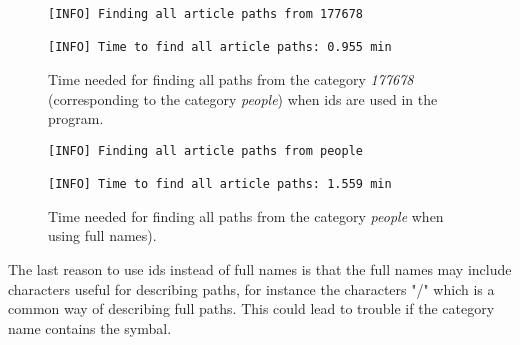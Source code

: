 \begin{figure}[h]
\centering
\begin{lstlisting}
[INFO] Finding all article paths from 177678

[INFO] Time to find all article paths: 0.955 min
\end{lstlisting}
\caption[Time for all paths for \emph{people} when using ids]{Time needed for finding all paths from the category \emph{177678} (corresponding to the category \emph{people}) when ids are used in the program.}
\label{fig:id_lookup}
\end{figure}


\begin{figure}[h]
\centering
\begin{lstlisting}
[INFO] Finding all article paths from people

[INFO] Time to find all article paths: 1.559 min
\end{lstlisting}
\caption[Time for all paths for \emph{people} when using full names]{Time needed for finding all paths from the category \emph{people} when using full names).}
\label{fig:fullname_lookup}
\end{figure}
 
The last reason to use ids instead of full names is that the full names may include characters useful for describing paths, for instance the characters "/" which is a common way of describing full paths. This could lead to trouble if the category name contains the symbal. 


